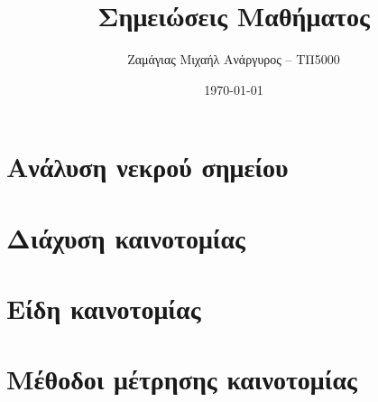 \documentclass[12pt]{turabian-researchpaper}
\title{Σημειώσεις Μαθήματος}
\author{Ζαμάγιας Μιχαήλ Ανάργυρος -- ΤΠ5000}
\date{\today}
\begin{document}
\begin{titlepage}
    \maketitle
\end{titlepage}

\tableofcontents
\newpage

\section{Ανάλυση νεκρού σημείου}
\section{Διάχυση καινοτομίας}
\section{Είδη καινοτομίας}
\section{Μέθοδοι μέτρησης καινοτομίας}
\end{document}

